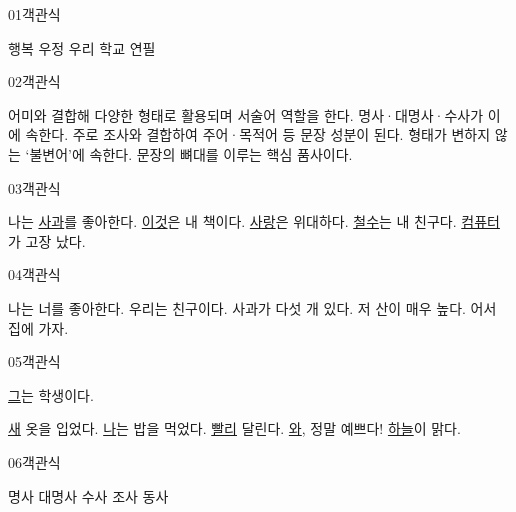 \documentclass[fs9,seriesRus]{korfarm-base}
\begin{document}

\par\medskip
\kfBeginMC
\begin{kfQBlock}{01}{객관식}
\begin{kfChoices}
\kfChoice 행복
\kfChoice 우정
\kfChoice 우리
\kfChoice 학교
\kfChoice 연필
\end{kfChoices}
\end{kfQBlock}
\begin{kfQBlock}{02}{객관식}
\begin{kfChoices}
\kfChoice 어미와 결합해 다양한 형태로 활용되며 서술어 역할을 한다.
\kfChoice 명사·대명사·수사가 이에 속한다.
\kfChoice 주로 조사와 결합하여 주어·목적어 등 문장 성분이 된다.
\kfChoice 형태가 변하지 않는 ‘불변어’에 속한다.
\kfChoice 문장의 뼈대를 이루는 핵심 품사이다.
\end{kfChoices}
\end{kfQBlock}
\begin{kfQBlock}{03}{객관식}
\begin{kfChoices}
\kfChoice 나는 \uline{사과}를 좋아한다.
\kfChoice \uline{이것}은 내 책이다.
\kfChoice \uline{사랑}은 위대하다.
\kfChoice \uline{철수}는 내 친구다.
\kfChoice \uline{컴퓨터}가 고장 났다.
\end{kfChoices}
\end{kfQBlock}
\begin{kfQBlock}{04}{객관식}
\begin{kfChoices}
\kfChoice 나는 너를 좋아한다.
\kfChoice 우리는 친구이다.
\kfChoice 사과가 다섯 개 있다.
\kfChoice 저 산이 매우 높다.
\kfChoice 어서 집에 가자.
\end{kfChoices}
\end{kfQBlock}
\begin{kfQBlock}{05}{객관식}
\begin{kfEvidence}\uline{그}는 학생이다.\end{kfEvidence}
\begin{kfChoices}
\kfChoice \uline{새} 옷을 입었다.
\kfChoice \uline{나}는 밥을 먹었다.
\kfChoice \uline{빨리} 달린다.
\kfChoice \uline{와}, 정말 예쁘다!
\kfChoice \uline{하늘}이 맑다.
\end{kfChoices}
\end{kfQBlock}
\begin{kfQBlock}{06}{객관식}
\begin{kfChoices}
\kfChoice 명사
\kfChoice 대명사
\kfChoice 수사
\kfChoice 조사
\kfChoice 동사
\end{kfChoices}
\end{kfQBlock}
\end{document}
